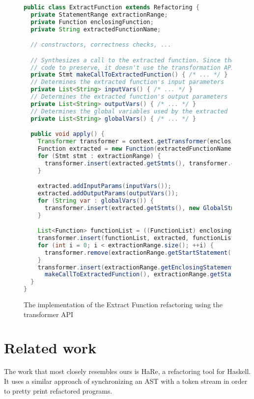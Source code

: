 \begin{figure}
\begin{lstlisting}[numbers=none, language=Java]
public class ExtractFunction extends Refactoring {
  private StatementRange extractionRange;
  private Function enclosingFunction;
  private String extractedFunctionName;

  // constructors, correctness checks, ...

  // Synthesizes a call to the extracted function. Since there is no
  // code to preserve, it doesn't use the transformation API.
  private Stmt makeCallToExtractedFunction() { /* ... */ }
  // Determines the extracted function's input parameters
  private List<String> inputVars() { /* ... */ }
  // Determines the extracted function's output parameters
  private List<String> outputVars() { /* ... */ }
  // Determines the global variables used by the extracted function
  private List<String> globalVars() { /* ... */ }

  public void apply() {
    Transformer transformer = context.getTransformer(enclosingFunction);
    Function extracted = new Function(extractedFunctionName);
    for (Stmt stmt : extractionRange) {
      transformer.insert(extracted.getStmts(), transformer.copy(stmt), extracted.getNumStmt());
    }

    extracted.addInputParams(inputVars());
    extracted.addOutputParams(outputVars());
    for (String var : globalVars()) {
      transformer.insert(extracted.getStmts(), new GlobalStmt(var), 0);
    }

    List<Function> functionList = ((FunctionList) enclosingFunction.getParent()).getFunctions();
    transformer.insert(functionList, extracted, functionList.getIndexOfChild(enclosingFunction) + 1);
    for (int i = 0; i < extractionRange.size(); ++i) {
      transformer.remove(extractionRange.getStartStatement());
    }
    transformer.insert(extractionRange.getEnclosingStatementList(),
      makeCallToExtractedFunction(), extractionRange.getStartIndex());
  }
}
\end{lstlisting}
\caption{The implementation of the Extract Function refactoring using the transformer API}
\label{Fig:ExtractFunction}
\end{figure}

\section{Related work}

The work that most closely resembles ours is HaRe, a refactoring tool for
Haskell.  It uses a similar approach of synchronizing an AST with a token
stream in order to pretty print refactored programs.

